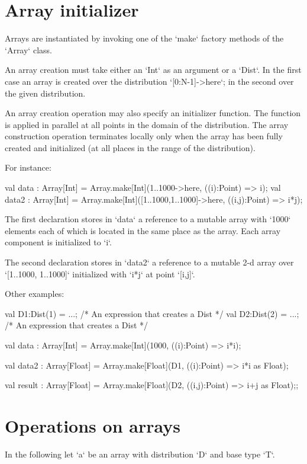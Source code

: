 {\section{Array initializer}\label{ArrayInitializer}\label{array!creation}

Arrays are instantiated by invoking one of the \xcd`make` factory
methods of the \xcd`Array` class.

An array creation 
must take either an \xcd`Int` as an argument or a \xcd`Dist`. In the first
case an array is created over the distribution \xcd`[0:N-1]->here`;
in the second over the given distribution. 

An array creation operation may also specify an initializer
function.
The function is applied in parallel
at all points in the domain of the distribution. The array
construction operation terminates locally only when the array has been
fully created and initialized (at all places in the range of the
distribution).

For instance:
\begin{xten}
val data : Array[Int]
    = Array.make[Int](1..1000->here, ((i):Point) => i);
val data2 : Array[Int]
    = Array.make[Int]([1..1000,1..1000]->here, ((i,j):Point) => i*j);
\end{xten}

{}\noindent 
The first declaration stores in \xcd`data` a reference to a mutable
array with \xcd`1000` elements each of which is located in the
same place as the array. Each array component is initialized to \xcd`i`.

The second declaration stores in \xcd`data2` a reference to a mutable
2-d array over \xcd`[1..1000, 1..1000]` initialized with \xcd`i*j`
at point \xcd`[i,j]`.

Other examples:
\begin{xten}
val D1:Dist(1) = ...; /* An expression that creates a Dist */
val D2:Dist(2) = ...; /* An expression that creates a Dist */

val data : Array[Int]
    = Array.make[Int](1000, ((i):Point) => i*i);

val data2 : Array[Float]
    = Array.make[Float](D1, ((i):Point) => i*i as Float);

val result : Array[Float]
   = Array.make[Float](D2, ((i,j):Point) => i+j as Float);;
\end{xten}

\section{Operations on arrays}
In the following let \xcd`a` be an array with distribution \xcd`D` and
base type \xcd`T`. 

}

